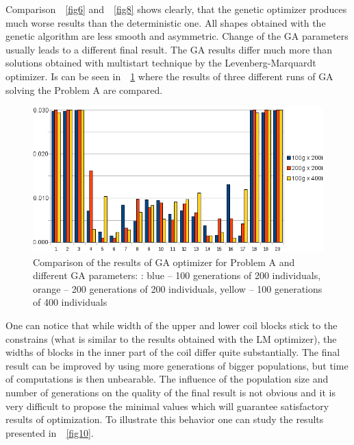 \documentclass[twocolumn,a4paper]{article}
\def\rref#1{\figurename~\ref{#1}}
\begin{document}
Comparison~\rref{fig6} and~\rref{fig8} shows clearly, that the genetic optimizer produces much worse results than the deterministic one. All shapes obtained with the genetic algorithm are less smooth and asymmetric. Change
of the GA parameters usually leads to a different final result. The GA results differ much more than solutions obtained with multistart technique by the Levenberg-Marquardt optimizer. Is can be seen in~\rref{fig9} where the results of three different runs of GA solving the Problem A are compared.
\begin{figure}[htb]
\begin{center}
 \includegraphics[width=0.999\linewidth]{img/por_cewek3_GA.png}
 \caption{Comparison of the results of GA optimizer for Problem A and different GA parameters: : blue -- 100 generations of 200 individuals, orange -- 200 generations of 200 individuals, yellow -- 100 generations of 400 individuals}
 \label{fig9}
 \end{center}
\end{figure}
One can notice that while width of the upper and lower coil blocks stick to the constrains (what is similar to the results
obtained with the LM optimizer), the widths of blocks in the inner part of the coil differ quite substantially.
The final result can be improved by using more generations of bigger populations, but time of computations is then unbearable. The influence of the population size and number of generations on the quality of the final result is not obvious and
it is very difficult to propose the minimal values which will guarantee satisfactory results of optimization.
To illustrate this behavior one can study the results presented in~\rref{fig10}.
\end{document}
